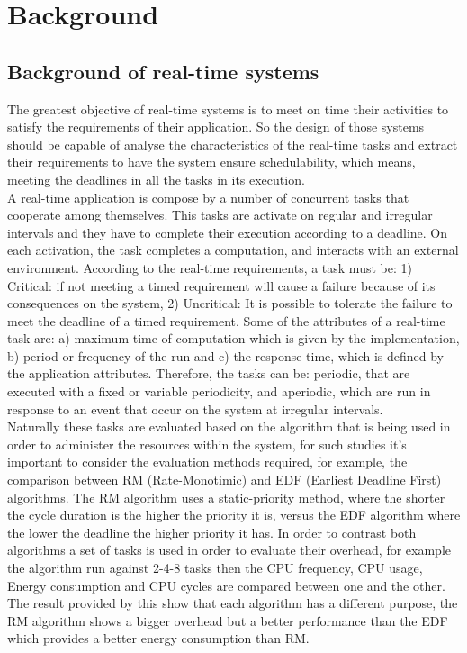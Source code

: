 \documentclass[conference]{IEEEtran}
\begin{document}
\section{Background}
\subsection{Background of real-time systems}
The greatest objective of real-time systems is to meet on time their activities to satisfy the requirements of their application. So the design of those systems should be capable of analyse the characteristics of the real-time tasks and extract their requirements to have the system ensure schedulability, which means, meeting the deadlines in all the tasks in its execution.\\
A real-time application is compose by a number of concurrent tasks that cooperate among themselves.  This tasks are activate  on regular and irregular intervals and they have to complete their execution according to a deadline. On each activation, the task completes a computation, and interacts with an external environment. According to the real-time requirements, a task must be: 1) Critical: if not meeting a timed requirement will cause a failure because of its consequences on the system, 2) Uncritical: It is possible to tolerate the failure to meet the deadline of a timed requirement. Some of the attributes of a real-time task are: a) maximum time of computation which is given by the implementation, b) period or frequency of the run and c) the response time, which is defined by the application attributes. Therefore, the tasks can be: periodic, that are executed with a fixed or variable periodicity, and aperiodic, which are run in response to an event that occur on the system at irregular intervals. \\
Naturally these tasks are evaluated based on the algorithm that is being used in order to administer the resources within the system,  for such studies it's important to consider the evaluation methods required, for example, the comparison between RM (Rate-Monotimic) and EDF (Earliest Deadline First) algorithms.\cite{BECKER01} 
The RM algorithm uses a static-priority method, where the shorter the cycle duration is the higher the priority it is, versus the EDF algorithm where the lower the deadline the higher priority it has. 
In order to contrast both algorithms a set of tasks is used in order to evaluate their overhead, for example the algorithm run against 2-4-8 tasks then the CPU frequency, CPU usage, Energy consumption and CPU cycles are compared between one and the other. 
The result provided by this \cite{BECKER01} show that each algorithm has a different purpose, the RM algorithm shows a bigger overhead but a better performance than the EDF which provides a better energy consumption than RM. 
 
\end{document}
